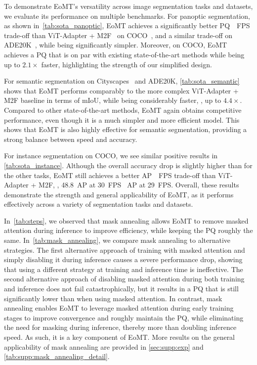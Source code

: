 \documentclass[10pt,twocolumn,letterpaper]{article}
\newcommand{\PAR}[1]{\vskip4pt \noindent {\bf #1~}}
\begin{document}
\PAR{EoMT on different benchmarks.}
To demonstrate EoMT’s versatility across image segmentation tasks and datasets, we evaluate its performance on multiple benchmarks. For panoptic segmentation, as shown in~\cref{tab:sota_panoptic}, EoMT achieves a significantly better PQ~\vs~FPS trade-off than ViT-Adapter + M2F~\cite{chen2023vitadapter, cheng2022mask2former} on COCO~\cite{lin2014coco}, and a similar trade-off on ADE20K~\cite{zhou2017ade20k}, while being significantly simpler. Moreover, on COCO, EoMT achieves a PQ that is on par with existing state-of-the-art methods while being up to $2.1\times$ faster, highlighting the strength of our simplified design. 


For semantic segmentation on Cityscapes~\cite{cordts2016cityscapes} and ADE20K, \cref{tab:sota_semantic} shows that EoMT performs comparably to the more complex ViT-Adapter + M2F baseline in terms of mIoU, while being considerably faster, \ie, up to $4.4\times$. Compared to other state-of-the-art methods, EoMT again obtains competitive performance, even though it is a much simpler and more efficient model. This shows that EoMT is also highly effective for semantic segmentation, providing a strong balance between speed and accuracy.


For instance segmentation on COCO, we see similar positive results in \cref{tab:sota_instance}. Although the overall accuracy drop is slightly higher than for the other tasks, EoMT still achieves a better AP~\vs~FPS trade-off than ViT-Adapter + M2F, \eg, 48.8~AP at 30~FPS ~AP at 29~FPS. Overall, these results demonstrate the strength and general applicability of EoMT, as it performs effectively across a variety of segmentation tasks and datasets.

\PAR{Importance of mask annealing.}
In~\cref{tab:steps}, we observed that mask annealing allows EoMT to remove masked attention during inference to improve efficiency, while keeping the PQ roughly the same. In~\cref{tab:mask_annealing}, we compare mask annealing to alternative strategies. 
The first alternative approach of training with masked attention and simply disabling it during inference causes a severe performance drop, showing that using a different strategy at training and inference time is ineffective. The second alternative approach of disabling masked attention during both training and inference does not fail catastrophically, but it results in a PQ that is still significantly lower than when using masked attention. In contrast, mask annealing enables EoMT to leverage masked attention during early training stages to improve convergence and roughly maintain the PQ, while eliminating the need for masking during inference, thereby more than doubling inference speed. As such, it is a key component of EoMT. More results on the general applicability of mask annealing are provided in
\cref{sec:supp:exp} and \cref{tab:supp:mask_annealing_detail}.
\end{document}

